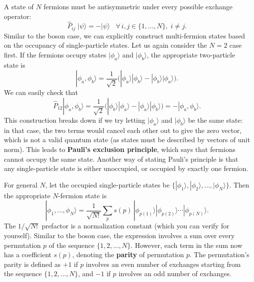 \documentclass[pra,12pt]{revtex4}
\begin{document}
A state of $N$ fermions must be antisymmetric under every possible
exchange operator:
$$\hat{P}_{ij}\; |\psi\rangle = -|\psi\rangle \;\;\; \forall\, i,j\in\{1,\dots,N\}, \; i\ne j.$$
Similar to the boson case, we can explicitly construct multi-fermion
states based on the occupancy of single-particle states.  Let us again
consider the $N=2$ case first.  If the fermions occupy states
$|\phi_a\rangle$ and $|\phi_b\rangle$, the appropriate two-particle
state is
$$|\phi_a,\phi_b\rangle = \frac{1}{\sqrt{2}} \Big(|\phi_a\rangle|\phi_b\rangle - |\phi_b\rangle|\phi_a\rangle\Big).$$
We can easily check that
$$\hat{P}_{12} |\phi_a,\phi_b\rangle = \frac{1}{\sqrt{2}} \Big(|\phi_b\rangle|\phi_a\rangle - |\phi_a\rangle|\phi_b\rangle\Big) = - |\phi_a,\phi_b\rangle.$$
This construction breaks down if we try letting $|\phi_a\rangle$ and
$|\phi_b\rangle$ be the same state: in that case, the two terms would
cancel each other out to give the zero vector, which is not a valid
quantum state (as states must be described by vectors of unit norm).
This leads to \textbf{Pauli's exclusion principle}, which says that
fermions cannot occupy the same state.  Another way of stating Pauli's
principle is that any single-particle state is either unoccupied, or
occupied by exactly one fermion.

For general $N$, let the occupied single-particle states be
$\{|\phi_1\rangle, |\phi_2\rangle,\dots,|\phi_N\rangle\}$.  Then the
appropriate $N$-fermion state is
$$|\phi_1,\dots,\phi_N\rangle = \frac{1}{\sqrt{N!}} \sum_p s(p)\, |\phi_{p(1)}\rangle |\phi_{p(2)}\rangle \cdots |\phi_{p(N)}\rangle.$$
The $1/\sqrt{N!}$ prefactor is a normalization constant (which you can
verify for yourself).  Similar to the boson case, the expression
involves a sum over every permutation $p$ of the sequence
$\{1,2,\dots,N\}$.  However, each term in the sum now has a
coefficient $s(p)$, denoting the \textbf{parity} of permutation $p$.
The permutation's parity is defined as $+1$ if $p$ involves an even
number of exchanges starting from the sequence $\{1,2,\dots,N\}$, and
$-1$ if $p$ involves an odd number of exchanges.
\end{document}
